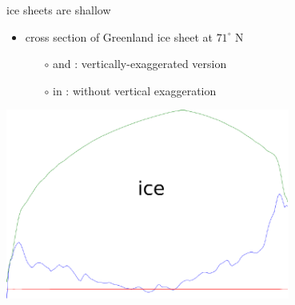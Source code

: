 \documentclass[hide notes,intlimits]{beamer}
\begin{document}
\begin{frame}{ice sheets are shallow}

\begin{itemize}
\item cross section of Greenland ice sheet at $71^\circ$ N
  \begin{itemize}
  \item[$\circ$] {\color{dark green}{green}} and {\color{dark blue}{blue}}: vertically-exaggerated version
  \item[$\circ$] in {\color{dark red}{red}}: without vertical exaggeration
  \end{itemize}
\end{itemize}
\normalsize

  \begin{center}
      \quad \includegraphics[width=0.7\textwidth]{greentransecttrimmed}
    
    \bigskip
    \qquad\qquad\qquad {}
  \end{center}
\end{frame}
\end{document}
